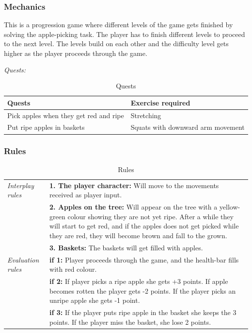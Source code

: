 \subsubsection{Mechanics} 
This is a progression game where different levels of the game gets finished by solving the apple-picking task. The player has to finish different levels to proceed to the next level. The levels build on each other and the difficulty level gets higher as the player proceeds through the game.

\emph{Quests:} 

\begin{table}
\begin{tabular}{|>{\raggedright}p{}|p{}|}
\hline
\textbf{Quests} & \textbf{Exercise required}  \\ \hline
Pick apples when they get red and ripe & Stretching  \\ \hline
Put ripe apples in baskets &  Squats with downward arm movement \\ \hline
\end{tabular}
\caption[Quests in the "Apple Picking" game]{Quests}
\label{tab:quests2}
\end{table}

\subsubsection{Rules} 

\begin{table} [H]
\centering
\begin{tabular}{|p{}|p{}|}
\hline
\emph{Interplay rules} & \textbf{1. The player character:} Will move to the movements received as player input. \\ \cline{2-2}
 &  \textbf{2. Apples on the tree:} Will appear on the tree with a yellow-green colour showing they are not yet ripe. After a while they will start to get red, and if the apples does not get picked while they are red, they will become brown and fall to the grown. \\ \cline{2-2}
& \textbf{3. Baskets:} The baskets will get filled with apples. \\ \hline
\emph{Evaluation rules} & \textbf{if 1:} Player proceeds through the game, and the health-bar fills with red colour.\\ \cline{2-2}
 & \textbf{if 2:} If player picks a ripe apple she gets +3 points. If apple becomes rotten the player gets -2 points. If the player picks an unripe apple she gets -1 point. \\ \cline{2-2}
& \textbf{if 3:} If the player puts ripe apple in the basket she keeps the 3 points. If the player miss the basket, she lose 2 points.  \\ \hline
\end{tabular}
\caption[Rules for the "Apple Picking" game]{Rules}
\label{tab:rules2}
\end{table}  

